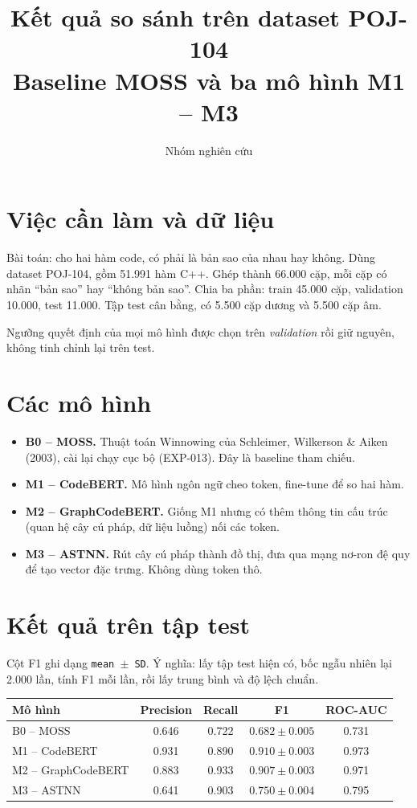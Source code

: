 \documentclass[11pt,a4paper]{article}
\title{\vspace{-2.0cm}\textbf{\color{headblue}Kết quả so sánh trên dataset POJ-104}\\[6pt]
       \large Baseline MOSS và ba mô hình M1 -- M3}
\author{Nhóm nghiên cứu}
\date{}
\newcommand{\hd}[1]{\textcolor{headblue}{\textbf{#1}}}
\begin{document}
\maketitle
\vspace{-1.2cm}

\section{Việc cần làm và dữ liệu}

Bài toán: cho hai hàm code, có phải là bản sao của nhau hay không. Dùng dataset
POJ-104, gồm 51.991 hàm C++. Ghép thành 66.000 cặp, mỗi cặp có nhãn ``bản sao''
hay ``không bản sao''. Chia ba phần: train 45.000 cặp, validation 10.000, test
11.000. Tập test cân bằng, có 5.500 cặp dương và 5.500 cặp âm.

Ngưỡng quyết định của mọi mô hình được chọn trên \emph{validation} rồi giữ
nguyên, không tinh chỉnh lại trên test.

\section{Các mô hình}

\begin{itemize}[leftmargin=1.3em, itemsep=2pt]
    \item \textbf{B0 -- MOSS.} Thuật toán Winnowing của Schleimer, Wilkerson \& Aiken
          (2003), cài lại chạy cục bộ (EXP-013). Đây là baseline tham chiếu.
    \item \textbf{M1 -- CodeBERT.} Mô hình ngôn ngữ cheo token, fine-tune để so hai hàm.
    \item \textbf{M2 -- GraphCodeBERT.} Giống M1 nhưng có thêm thông tin cấu trúc
          (quan hệ cây cú pháp, dữ liệu luồng) nối các token.
    \item \textbf{M3 -- ASTNN.} Rút cây cú pháp thành đồ thị, đưa qua mạng nơ-ron
          đệ quy để tạo vector đặc trưng. Không dùng token thô.
\end{itemize}

\section{Kết quả trên tập test}

Cột F1 ghi dạng \texttt{mean $\pm$ SD}. Ý nghĩa: lấy tập test hiện có, bốc
ngẫu nhiên lại 2.000 lần, tính F1 mỗi lần, rồi lấy trung bình và độ lệch chuẩn.

\begin{center}
\begin{tabular}{lcccc}
\toprule
\hd{Mô hình} & \hd{Precision} & \hd{Recall} & \hd{F1} & \hd{ROC-AUC} \\
\midrule
B0 -- MOSS              & 0.646 & 0.722 & $0.682 \pm 0.005$ & 0.731 \\
M1 -- CodeBERT          & 0.931 & 0.890 & $0.910 \pm 0.003$ & 0.973 \\
M2 -- GraphCodeBERT     & 0.883 & 0.933 & $0.907 \pm 0.003$ & 0.971 \\
M3 -- ASTNN             & 0.641 & 0.903 & $0.750 \pm 0.004$ & 0.795 \\
\bottomrule
\end{tabular}
\end{center}
\end{document}

